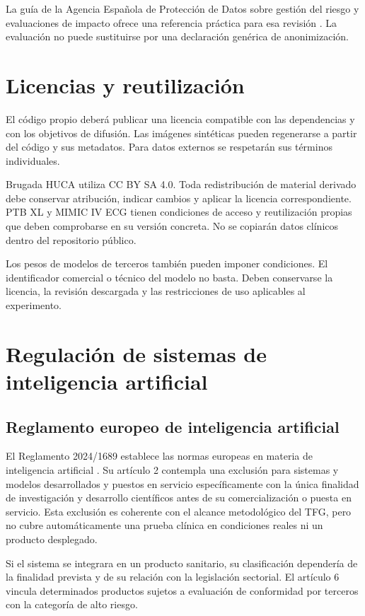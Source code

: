La guía de la Agencia Española de Protección de Datos sobre gestión del riesgo y evaluaciones de impacto ofrece una referencia práctica para esa revisión \cite{aepd2021risk}. La evaluación no puede sustituirse por una declaración genérica de anonimización.

\section{Licencias y reutilización}

El código propio deberá publicar una licencia compatible con las dependencias y con los objetivos de difusión. Las imágenes sintéticas pueden regenerarse a partir del código y sus metadatos. Para datos externos se respetarán sus términos individuales.

Brugada HUCA utiliza CC BY SA 4.0. Toda redistribución de material derivado debe conservar atribución, indicar cambios y aplicar la licencia correspondiente. PTB XL y MIMIC IV ECG tienen condiciones de acceso y reutilización propias que deben comprobarse en su versión concreta. No se copiarán datos clínicos dentro del repositorio público.

Los pesos de modelos de terceros también pueden imponer condiciones. El identificador comercial o técnico del modelo no basta. Deben conservarse la licencia, la revisión descargada y las restricciones de uso aplicables al experimento.

\section{Regulación de sistemas de inteligencia artificial}

\subsection{Reglamento europeo de inteligencia artificial}

El Reglamento 2024/1689 establece las normas europeas en materia de inteligencia artificial \cite{aiact2024}. Su artículo 2 contempla una exclusión para sistemas y modelos desarrollados y puestos en servicio específicamente con la única finalidad de investigación y desarrollo científicos antes de su comercialización o puesta en servicio. Esta exclusión es coherente con el alcance metodológico del TFG, pero no cubre automáticamente una prueba clínica en condiciones reales ni un producto desplegado.

Si el sistema se integrara en un producto sanitario, su clasificación dependería de la finalidad prevista y de su relación con la legislación sectorial. El artículo 6 vincula determinados productos sujetos a evaluación de conformidad por terceros con la categoría de alto riesgo.

